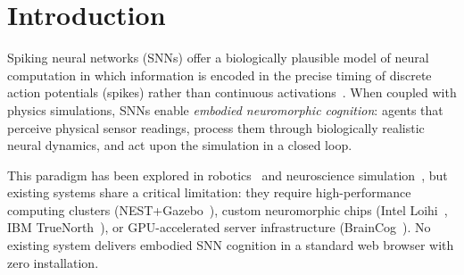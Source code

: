 \documentclass[10pt]{article}
\begin{document}
\begin{abstract}
harness host and producing a fully hash-chained provenance record with
100\% integrity.
Every perception--cognition--action cycle is committed to a hash-chain trace,
producing the first \emph{compute substrate} to emit auditable, tamper-evident,
replayable traces of neuromorphic decisions at hardware throughput in an
embodied simulation.
The \texttt{@holoscript/snn-webgpu} package is validated by a dedicated Vitest
suite in the repository (full-package run reference: 2026-04-17).
Headline GPU throughputs and tropical GEMM figures above reference the dated snapshot
\texttt{research/benchmark-results-2026-04-12.md}; interactive-scale neuron counts
(max verified discrete run: RTX~3060 Laptop GPU, \texttt{strictAdapter=true},
peak $N=1{,}048{,}576$ at $5{,}890.876$ M neurons/s;
artifact \texttt{HoloScript/.bench-logs/paper-2-lif-throughput-rtx3060.json},
generated 2026-05-06 on commit \texttt{d0a990964},
driver 591.74) are measured on
commodity integrated and discrete GPUs and run in any WebGPU-capable browser.
\end{abstract}

\section{Introduction}
\label{sec:intro}

Spiking neural networks (SNNs) offer a biologically plausible model of neural computation
in which information is encoded in the precise timing of discrete action potentials (spikes)
rather than continuous activations~\cite{maass1997networks, gerstner2002spiking}.
When coupled with physics simulations, SNNs enable \emph{embodied neuromorphic cognition}:
agents that perceive physical sensor readings, process them through biologically realistic
neural dynamics, and act upon the simulation in a closed loop.

This paradigm has been explored in robotics~\cite{tang2024braincog} and neuroscience
simulation~\cite{gewaltig2007nest}, but existing systems share a critical limitation:
they require high-performance computing clusters (NEST+Gazebo~\cite{gewaltig2007nest}),
custom neuromorphic chips (Intel Loihi~\cite{davies2018loihi}, IBM TrueNorth~\cite{merolla2014truenorth}),
or GPU-accelerated server infrastructure (BrainCog~\cite{tang2024braincog}).
No existing system delivers embodied SNN cognition in a standard web browser
with zero installation.
\end{document}
